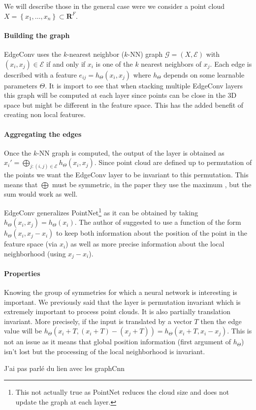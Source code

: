 \documentclass[french]{article}
\newcommand{\knn}{$k$-NN}
\begin{document}
	We will describe those in the general case were we consider a point cloud $X=\left\{x_1,\dots,x_n\right\}\subset\mathbf{R}^F$.
	
	\paragraph{Building the graph} EdgeConv uses the $k$-nearest neighbor (\knn) graph $\mathcal{G} = (X, \mathcal{E})$ with $(x_i,x_j)\in \mathcal{E}$ if and only if $x_i$ is one of the $k$ nearest neighbors of $x_j$. Each edge is described with a feature $e_{ij}=h_{\Theta}(x_i,x_j)$ where $h_{\Theta}$ depends on some learnable parameters $\Theta$. It is import to see that when stacking multiple EdgeConv layers this graph will be computed at each layer since points can be close in the 3D space but might be different in the feature space. This has the added benefit of creating non local features.
	
	\paragraph{Aggregating the edges}
	Once the \knn{} graph is computed, the output of the layer is obtained as $x_i' = \bigoplus_{j:(i,j)\in\mathcal{E}}h_{\Theta}(x_i,x_j)$. Since point cloud are defined up to permutation of the points we want the EdgeConv layer to be invariant to this permutation. This means that $\bigoplus$ must be symmetric, in the paper they use the maximum , but the sum would work as well.
	
	EdgeConv generalizes PointNet\footnote{This not actually true as PointNet reduces the cloud size and does not update the graph at each layer.} as it can be obtained by taking $h_{\Theta}(x_i, x_j)=h_{\Theta}(x_i)$. The author of suggested to use a function of the form $h_{\Theta}(x_i, x_j - x_i)$ to keep both information about the position of the point in the feature space (via $x_i$) as well as more precise information about the local neighborhood (using $x_j-x_i$).
	
	\paragraph{Properties} Knowing the group of symmetries for which a neural network is interesting is important. We previously said that the layer is permutation invariant which is extremely important to process point clouds. It is also partially translation invariant. More precisely, if the input is translated by a vector $T$ then the edge value will be $h_{\Theta}(x_i+T,(x_i+T) - (x_j+T)) = h_{\Theta}(x_i+T,x_i - x_j)$. This is not an issue as it means that global position information (first argument of $h_{\Theta}$) isn't lost but the processing of the local neighborhood is invariant.
	
	J'ai pas parlé du lien avec les graphCnn
	
	
	
\end{document}
